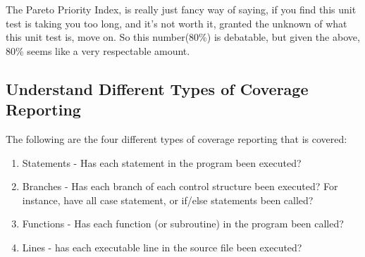 The Pareto Priority Index, is really just fancy way of saying, if you find this
unit test is taking you too long, and it's not worth it, granted the unknown
of what this unit test is, move on. So this number(80\%) is debatable, but given
the above, 80\% seems like a very respectable amount.

\subsection{ Understand Different Types of Coverage Reporting }
The following are the four different types of coverage reporting that is
covered:
\begin{enumerate}
  \item Statements - Has each statement in the program been executed?
  \item Branches - Has each branch of each control structure been executed? For
  instance, have all case statement, or if/else statements been called?
  \item Functions - Has each function (or subroutine) in the program been called?
  \item Lines - has each executable line in the source file been executed?
\end{enumerate}

